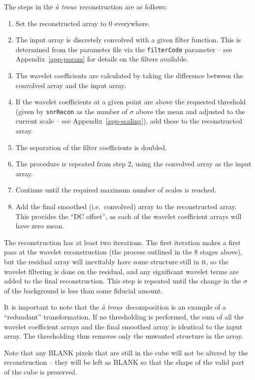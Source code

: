 \documentclass[12pt,a4paper]{article}
\newcommand{\ie}{i.e.\ }
\newcommand{\atrous}{\textit{{\`a} trous}}
\begin{document}
The steps in the \atrous\ reconstruction are as follows:
\begin{enumerate}
\item Set the reconstructed array to 0 everywhere.
\item The input array is discretely convolved with a given filter
  function. This is determined from the parameter file via the
  \texttt{filterCode} parameter -- see Appendix~\ref{app-param} for
  details on the filters available.
\item The wavelet coefficients are calculated by taking the difference
  between the convolved array and the input array.
\item If the wavelet coefficients at a given point are above the
  requested threshold (given by \texttt{snrRecon} as the number of
  $\sigma$ above the mean and adjusted to the current scale -- see
  Appendix~\ref{app-scaling}), add these to the reconstructed array.
\item The separation of the filter coefficients is doubled.
\item The procedure is repeated from step 2, using the convolved array
  as the input array.
\item Continue until the required maximum number of scales is reached.
\item Add the final smoothed (\ie convolved) array to the
  reconstructed array. This provides the ``DC offset'', as each of the
  wavelet coefficient arrays will have zero mean.
\end{enumerate}

The reconstruction has at least two iterations. The first iteration
makes a first pass at the wavelet reconstruction (the process outlined
in the 8 stages above), but the residual array will inevitably have
some structure still in it, so the wavelet filtering is done on the
residual, and any significant wavelet terms are added to the final
reconstruction. This step is repeated until the change in the $\sigma$
of the background is less than some fiducial amount.

It is important to note that the \atrous\ decomposition is an
example of a ``redundant'' transformation. If no thresholding is
performed, the sum of all the wavelet coefficient arrays and the final
smoothed array is identical to the input array. The thresholding thus
removes only the unwanted structure in the array.

Note that any BLANK pixels that are still in the cube will not be
altered by the reconstruction -- they will be left as BLANK so that
the shape of the valid part of the cube is preserved.
\end{document}
